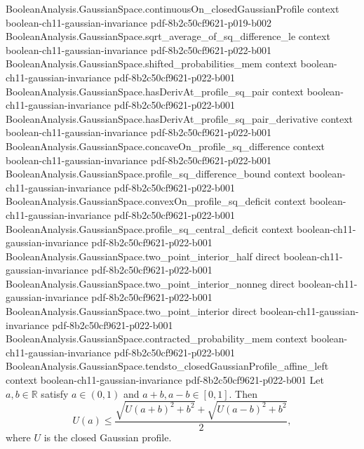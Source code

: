 \begin{lemma}
\proofstep
  {BooleanAnalysis.GaussianSpace.continuousOn_closedGaussianProfile}
  {context}
  {boolean-ch11-gaussian-invariance}
  {pdf-8b2c50cf9621-p019-b002}
\proofstep
  {BooleanAnalysis.GaussianSpace.sqrt_average_of_sq_difference_le}
  {context}
  {boolean-ch11-gaussian-invariance}
  {pdf-8b2c50cf9621-p022-b001}
\proofstep
  {BooleanAnalysis.GaussianSpace.shifted_probabilities_mem}
  {context}
  {boolean-ch11-gaussian-invariance}
  {pdf-8b2c50cf9621-p022-b001}
\proofstep
  {BooleanAnalysis.GaussianSpace.hasDerivAt_profile_sq_pair}
  {context}
  {boolean-ch11-gaussian-invariance}
  {pdf-8b2c50cf9621-p022-b001}
\proofstep
  {BooleanAnalysis.GaussianSpace.hasDerivAt_profile_sq_pair_derivative}
  {context}
  {boolean-ch11-gaussian-invariance}
  {pdf-8b2c50cf9621-p022-b001}
\proofstep
  {BooleanAnalysis.GaussianSpace.concaveOn_profile_sq_difference}
  {context}
  {boolean-ch11-gaussian-invariance}
  {pdf-8b2c50cf9621-p022-b001}
\proofstep
  {BooleanAnalysis.GaussianSpace.profile_sq_difference_bound}
  {context}
  {boolean-ch11-gaussian-invariance}
  {pdf-8b2c50cf9621-p022-b001}
\proofstep
  {BooleanAnalysis.GaussianSpace.convexOn_profile_sq_deficit}
  {context}
  {boolean-ch11-gaussian-invariance}
  {pdf-8b2c50cf9621-p022-b001}
\proofstep
  {BooleanAnalysis.GaussianSpace.profile_sq_central_deficit}
  {context}
  {boolean-ch11-gaussian-invariance}
  {pdf-8b2c50cf9621-p022-b001}
\proofstep
  {BooleanAnalysis.GaussianSpace.two_point_interior_half}
  {direct}
  {boolean-ch11-gaussian-invariance}
  {pdf-8b2c50cf9621-p022-b001}
\proofstep
  {BooleanAnalysis.GaussianSpace.two_point_interior_nonneg}
  {direct}
  {boolean-ch11-gaussian-invariance}
  {pdf-8b2c50cf9621-p022-b001}
\proofstep
  {BooleanAnalysis.GaussianSpace.two_point_interior}
  {direct}
  {boolean-ch11-gaussian-invariance}
  {pdf-8b2c50cf9621-p022-b001}
\proofstep
  {BooleanAnalysis.GaussianSpace.contracted_probability_mem}
  {context}
  {boolean-ch11-gaussian-invariance}
  {pdf-8b2c50cf9621-p022-b001}
\proofstep
  {BooleanAnalysis.GaussianSpace.tendsto_closedGaussianProfile_affine_left}
  {context}
  {boolean-ch11-gaussian-invariance}
  {pdf-8b2c50cf9621-p022-b001}
Let $a,b\in\mathbb R$ satisfy $a\in(0,1)$ and $a+b,a-b\in[0,1]$. Then
\[
U(a)\le \frac{\sqrt{U(a+b)^2+b^2}+\sqrt{U(a-b)^2+b^2}}{2},
\]
where $U$ is the closed Gaussian profile.
\end{lemma}
